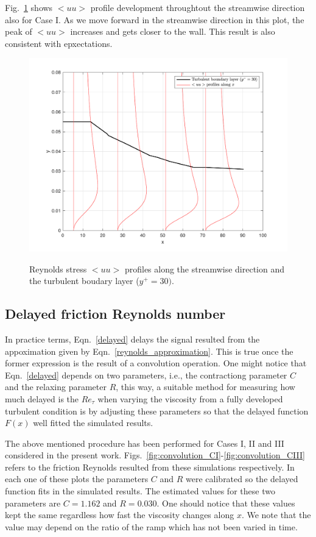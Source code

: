 \documentclass[twocolumn,10pt]{asme2e}
\begin{document}
Fig.~\ref{fig:uu_CI} shows \(<uu>\) profile development throughtout the streamwise direction also for Case I. As we move forward in the streamwise direction in this plot, the peak of \(<uu>\) increases and gets closer to the wall. This result is also consistent with epxectations.

\begin{figure}[t]
\centering
\scalebox{0.5}
{\includegraphics{uu_CI.pdf}}
\caption{Reynolds stress \(<uu>\) profiles along the streamwise direction and the turbulent boudary layer (\(y^+=30)\).}
\label{fig:uu_CI}
\end{figure}

\subsection*{Delayed friction Reynolds number}

In practice terms, Eqn.~\ref{delayed} delays the signal resulted from the appoximation given by Eqn.~\ref{reynolds_approximation}. This is true once the former expression is the result of a convolution operation. One might notice that Eqn.~\ref{delayed} depends on two parameters, i.e., the contractiong parameter \(C\) and the relaxing parameter \(R\), this way, a suitable method for measuring how much delayed is the \(Re_{\tau}\) when varying the viscosity from a fully developed turbulent condition is by adjusting these parameters so that the delayed function \(F(x)\) well fitted the simulated results.

The above mentioned procedure has been performed for Cases I, II and III considered in the present work. Figs.~\ref{fig:convolution_CI}-\ref{fig:convolution_CIII} refers to the friction Reynolds resulted from these simulations respectively. In each one of these plots the parameters \(C\) and \(R\) were calibrated so the delayed function fits in the simulated results. The estimated values for these two parameters are \(C=1.162\) and \(R=0.030\). One should notice that these values kept the same regardless how fast the viscosity changes along \(x\). We note that the value may depend on the ratio of the ramp which has not been varied in time.
\end{document}
